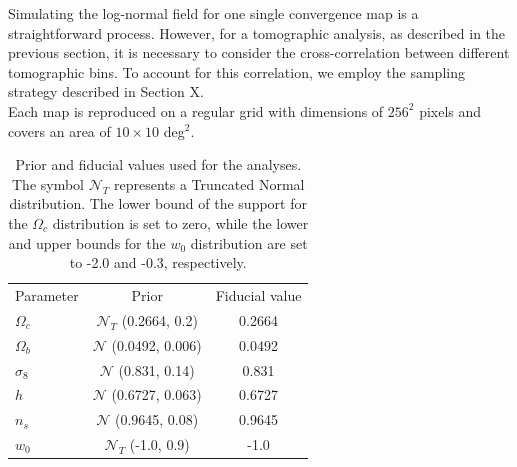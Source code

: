 \documentclass{aa}
\begin{document}
Simulating the log-normal field for one single convergence map is a straightforward process. 
However, for a tomographic analysis, as described in the previous section, it is necessary to consider the cross-correlation between different tomographic bins. To account for this correlation, we employ the sampling strategy described in Section X. \\
Each map is reproduced on a regular grid with dimensions of $256^2$ pixels and covers an area of $10\times 10$ deg$^2$.

\begin{table}
	\centering
	\caption{ Prior and fiducial values used for the analyses. 
 The symbol $\mathcal{N}_T$ represents a Truncated Normal distribution. The lower bound of the support for the $\Omega_c$ distribution is set to zero, while the lower and upper bounds for the $w_0$ distribution are set to -2.0 and -0.3, respectively.}
	\begin{tabular}{lcc} 
		\hline \hline
		Parameter  & Prior & Fiducial value \\
		$\Omega_c$ & $\mathcal{N}_T$ (0.2664, 0.2) & 0.2664 \\
		$\Omega_b$ & $\mathcal{N}$ (0.0492, 0.006) & 0.0492 \\
		$\sigma_8$ & $\mathcal{N}$ (0.831, 0.14) & 0.831 \\
		$h$ & $\mathcal{N}$ (0.6727, 0.063) & 0.6727\\
		$n_s$ & $\mathcal{N}$ (0.9645, 0.08) & 0.9645 \\
		$w_{0}$ &  $\mathcal{N}_T$ (-1.0, 0.9) &  -1.0 \\
		\hline
	\end{tabular}
	\label{tab:prior}
\end{table}
\end{document}
